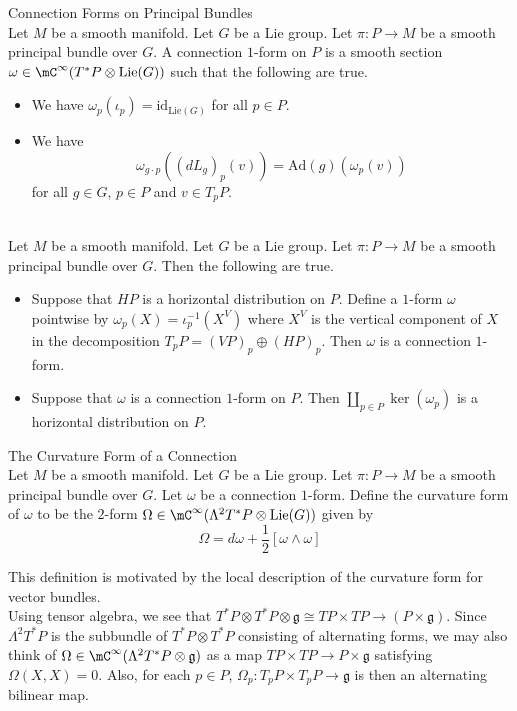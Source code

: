 \documentclass[a4paper]{article}
\begin{document}
\begin{defn}{Connection Forms on Principal Bundles}{}\\
Let $M$ be a smooth manifold. Let $G$ be a Lie group. Let $\pi:P\to M$ be a smooth principal bundle over $G$. A connection $1$-form on $P$ is a smooth section $\omega\in\mC^\infty(T^\ast P\otimes\text{Lie}(G))$ such that the following are true. 
\begin{itemize}
\item We have $\omega_p(\iota_p)=\text{id}_{\text{Lie}(G)}$ for all $p\in P$. 
\item We have $$\omega_{g\cdot p}((dL_g)_p(v))=\text{Ad}(g)(\omega_p(v))$$ for all $g\in G$, $p\in P$ and $v\in T_pP$. 
\end{itemize}
\end{defn}

\begin{prp}{}{}\\
Let $M$ be a smooth manifold. Let $G$ be a Lie group. Let $\pi:P\to M$ be a smooth principal bundle over $G$. Then the following are true. 
\begin{itemize}
\item Suppose that $HP$ is a horizontal distribution on $P$. Define a $1$-form $\omega$ pointwise by $\omega_p(X)=\iota_p^{-1}(X^V)$ where $X^V$ is the vertical component of $X$ in the decomposition $T_pP=(VP)_p\oplus(HP)_p$. Then $\omega$ is a connection $1$-form. 
\item Suppose that $\omega$ is a connection $1$-form on $P$. Then $\coprod_{p\in P}\ker(\omega_p)$ is a horizontal distribution on $P$. 
\end{itemize}
\end{prp}

\begin{defn}{The Curvature Form of a Connection}{}\\
Let $M$ be a smooth manifold. Let $G$ be a Lie group. Let $\pi:P\to M$ be a smooth principal bundle over $G$. Let $\omega$ be a connection $1$-form. Define the curvature form of $\omega$ to be the $2$-form $\Omega\in\mC^\infty(\Lambda^2T^\ast P\otimes\text{Lie}(G))$ given by $$\Omega=d\omega+\frac{1}{2}[\omega\wedge\omega]$$
\end{defn}

This definition is motivated by the local description of the curvature form for vector bundles. \\

Using tensor algebra, we see that $T^\ast P\otimes T^\ast P\otimes\mathfrak{g}\cong TP\times TP\to(P\times\mathfrak{g})$. Since $\Lambda^2T^\ast P$ is the subbundle of $T^\ast P\otimes T^\ast P$ consisting of alternating forms, we may also think of $\Omega\in\mC^\infty(\Lambda^2T^\ast P\otimes\mathfrak{g})$ as a map $TP\times TP\to P\times\mathfrak{g}$ satisfying $\Omega(X,X)=0$. Also, for each $p\in P$, $\Omega_p:T_pP\times T_pP\to\mathfrak{g}$ is then an alternating bilinear map. 
\end{document}
